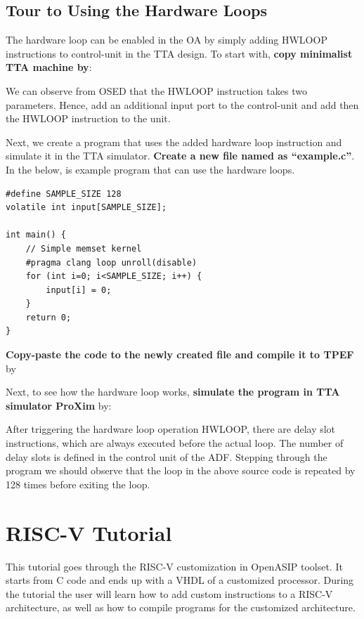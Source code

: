 \documentclass[a4paper,twoside]{tceusermanual}
\begin{document}
\subsection{Tour to Using the Hardware Loops}
The hardware loop can be enabled in the OA by simply adding HWLOOP
instructions to control-unit in the TTA design. To start with, \textbf{copy
minimalist TTA machine by}:


We can observe from OSED that the HWLOOP instruction takes two parameters.
Hence, add an additional input port to the control-unit and add then the
HWLOOP instruction to the unit.

Next, we create a program that uses the added hardware loop instruction
and simulate it in the TTA simulator. \textbf{Create a new file named as
``example.c''}. In the below, is example program that can use the hardware
loops.

\begin{verbatim}
#define SAMPLE_SIZE 128
volatile int input[SAMPLE_SIZE];

int main() {
    // Simple memset kernel
    #pragma clang loop unroll(disable)
    for (int i=0; i<SAMPLE_SIZE; i++) {
        input[i] = 0;
    }
    return 0;
}
\end{verbatim}

\textbf{Copy-paste the code to the newly created file and compile it to TPEF} by


Next, to see  how the hardware loop works,  \textbf{simulate the program
  in TTA simulator ProXim} by:


After triggering the hardware loop operation HWLOOP, there are delay
slot instructions,  which are  always executed before the  actual loop.
The number  of delay slots is  defined in the control  unit of  the ADF.
Stepping  through the  program we  should observe that the loop in the
above source  code is repeated by 128 times before exiting the  loop.


\section{RISC-V Tutorial}
This tutorial goes through the RISC-V customization in OpenASIP toolset. It
starts from C code and ends up with a VHDL of a customized processor.
During the tutorial the user will learn how to add custom instructions to a 
RISC-V architecture, as well as how to compile programs for the customized
architecture.
\end{document}
